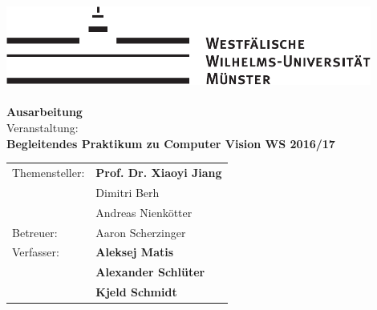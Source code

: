 \thispagestyle{empty}
\begin{center}
\vspace*{2cm}
\includegraphics[width=12cm,natwidth=12cm,natheight=3cm]{img/wwu-logo-neu.pdf}\\
\vspace*{2cm}
\Large
\textbf{\inserttitle}\\
\normalsize
\vspace*{2cm}
\textbf{Ausarbeitung}\\
\vspace*{1cm}
Veranstaltung:\\
\textbf{Begleitendes Praktikum zu Computer Vision WS 2016/17}
\end{center}
\vfill

\begin{center}
\begin{tabular}{ll}
Themensteller:&\textbf{Prof. Dr. Xiaoyi Jiang}\\
&Dimitri Berh\\
&Andreas Nienkötter\\
Betreuer:&Aaron Scherzinger\\
Verfasser:&\textbf{Aleksej Matis}\\
&\textbf{Alexander Schlüter}\\
&\textbf{Kjeld Schmidt}
\end{tabular} 
\end{center}